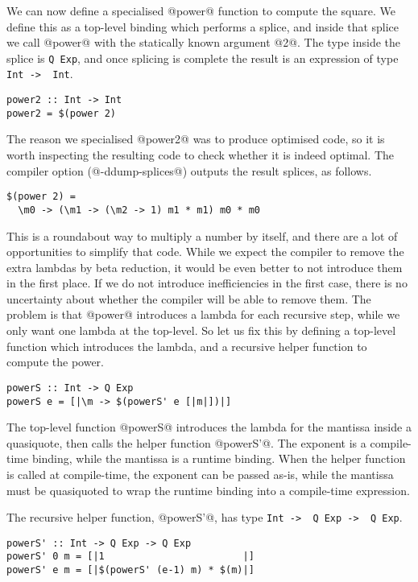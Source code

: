 We can now define a specialised @power@ function to compute the square.
We define this as a top-level binding which performs a splice, and inside that splice we call @power@ with the statically known argument @2@.
The type inside the splice is \lstinline/Q Exp/, and once splicing is complete the result is an expression of type \lstinline/Int ->  Int/.

\begin{lstlisting}
power2 :: Int -> Int
power2 = $(power 2)
\end{lstlisting}

The reason we specialised @power2@ was to produce optimised code, so it is worth inspecting the resulting code to check whether it is indeed optimal.
The compiler option (@-ddump-splices@) outputs the result splices, as follows.

\begin{lstlisting}
$(power 2) =
  \m0 -> (\m1 -> (\m2 -> 1) m1 * m1) m0 * m0
\end{lstlisting}

This is a roundabout way to multiply a number by itself, and there are a lot of opportunities to simplify that code.
While we expect the compiler to remove the extra lambdas by beta reduction, it would be even better to not introduce them in the first place.
If we do not introduce inefficiencies in the first case, there is no uncertainty about whether the compiler will be able to remove them.
The problem is that @power@ introduces a lambda for each recursive step, while we only want one lambda at the top-level.
So let us fix this by defining a top-level function which introduces the lambda, and a recursive helper function to compute the power.

\begin{lstlisting}
powerS :: Int -> Q Exp
powerS e = [|\m -> $(powerS' e [|m|])|]
\end{lstlisting}

The top-level function @powerS@ introduces the lambda for the mantissa inside a quasiquote, then calls the helper function @powerS'@.
The exponent is a compile-time binding, while the mantissa is a runtime binding.
When the helper function is called at compile-time, the exponent can be passed as-is, while the mantissa must be quasiquoted to wrap the runtime binding into a compile-time expression.

The recursive helper function, @powerS'@, has type \lstinline/Int ->  Q Exp ->  Q Exp/.

\begin{lstlisting}
powerS' :: Int -> Q Exp -> Q Exp
powerS' 0 m = [|1                        |]
powerS' e m = [|$(powerS' (e-1) m) * $(m)|]
\end{lstlisting}


